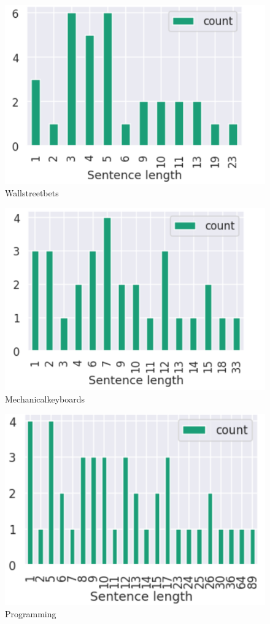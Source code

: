 \documentclass[sigconf,nonacm=true]{acmart}
\begin{document}
\begin{figure}[H]
	\centering
	\includegraphics[scale = 0.35]{sentence1.png}
	\caption{Wallstreetbets}
\end{figure}
\begin{figure}[H]
	\centering
	\includegraphics[scale=0.35]{sentence2.png}
	\caption{Mechanicalkeyboards}
\end{figure}
\begin{figure}[H]
	\centering
	\includegraphics[scale=0.35]{sentence3.png}
	\caption{Programming}
\end{figure}
\end{document}
